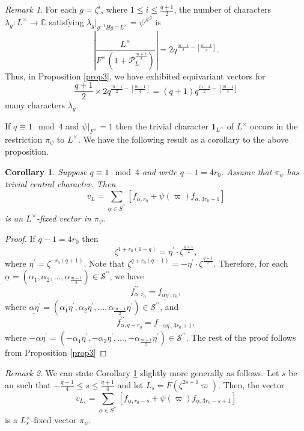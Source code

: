 \documentclass[12pt]{amsart}
\newtheorem{corollary}[theorem]{Corollary}%
\theoremstyle{definition}
\theoremstyle{remark}
\newtheorem{remark}{Remark}
\begin{document}
\begin{remark}\label{rmk3}
For each $g=\zeta^i$, where $1 \leq i \leq \frac{q+1}{2}$, the number of characters $\lambda_g: L^\times \rightarrow \mathbb C$ satisfying $\lambda_g|_{g^{-1}Hg \cap L^\times} = \psi^{{\#}^g}$ is 
\[\left| \frac{L^\times}{F^\times (1 + \mathcal P_L^{\frac{m+1}{2}})} \right| = 2q^{\frac{m-1}{2} - \left[\frac{m-1}{4} \right]}.\]
Thus, in Proposition \ref{prop3}, we have exhibited equivariant vectors for 
\[\frac{q+1}{2} \times 2q^{\frac{m-1}{2} - \left[\frac{m-1}{4} \right]} = (q+1)q^{\frac{m-1}{2} - \left[\frac{m-1}{4} \right]}\] many characters $\lambda_g$. 
\end{remark}

If $q \equiv 1 \mod 4$ and $\psi|_{F^\times} = 1$ then the trivial character $\textbf{1}_{L^\times}$ of $L^\times$ occurs in the restriction $\pi_\psi$ to $L^\times$.  We have the following result as a corollary to the above proposition.

\begin{corollary}\label{cor3}
Suppose $q \equiv 1 \mod 4$ and write $q-1 = 4r_0$. Assume that $\pi_\psi$ has trivial central character. Then
\[v_L = \sum\limits_{\underline{\alpha} \in S^{\prime \prime} } \left[ f_{\underline{\alpha}, r_0} + \psi(\varpi) f_{\underline{\alpha}, 3r_0+1} \right]\]
is an $L^\times$-fixed vector in $\pi_\psi$.
\end{corollary}

\begin{proof}
If $q-1 = 4r_0$ then 
\[\zeta^{1+ r_0 (1-q)} = \eta^\prime \cdot \zeta^{\frac{q+1}{2}},\]
where $\eta^\prime = \zeta^{-r_0(q+1)}$. Note that $\zeta^{q+ r_0 (q-1)} = -\eta^\prime \cdot  \zeta^{\frac{q+1}{2}}$. Therefore, for each $\underline{\alpha}=(\alpha_1, \alpha_2, \dots, \alpha_{\frac{m-1}{2}}) \in \mathcal{S}^{\prime \prime}$, we have
\[f_{\underline{\alpha}, r_0}^{\prime\prime} = f_{\underline{\alpha \eta}^\prime, r_0},\]
where $\underline{\alpha \eta}^\prime = (\alpha_1 \eta^\prime, \alpha_2 \eta^\prime, \dots, \alpha_{\frac{m-1}{2}}\eta^\prime) \in \mathcal{S}^{\prime \prime}$, and 
\[f_{\underline{\alpha}, q-r_0}^{\prime \prime} = f_{-\underline{\alpha \eta}^\prime, 3r_0+1},\]
where $-\underline{\alpha \eta}^\prime = (-\alpha_1 \eta^\prime, -\alpha_2 \eta^\prime, \dots, -\alpha_{\frac{m-1}{2}}\eta^\prime) \in \mathcal{S}^{\prime \prime}$. The rest of the proof follows from Proposition \ref{prop3}
\end{proof}

\begin{remark}\label{extra-l}
We can state Corollary \ref{cor3} slightly more generally as follows. Let $s$ be an such that $-\frac{q-1}{4} \leq s \leq \frac{q+1}{4}$ and let $L_s=F(\zeta^{2s+1} \varpi)$. Then, the vector 
\[v_{L_s}= \sum\limits_{\underline{\alpha} \in S^{\prime \prime}} [f_{\underline{\alpha}, r_0-s} + \psi(\varpi) f_{\underline{\alpha}, 3r_0-s+1}]\]
is a $L_s^\times$-fixed vector $\pi_\psi$.
\end{remark}
\end{document}
